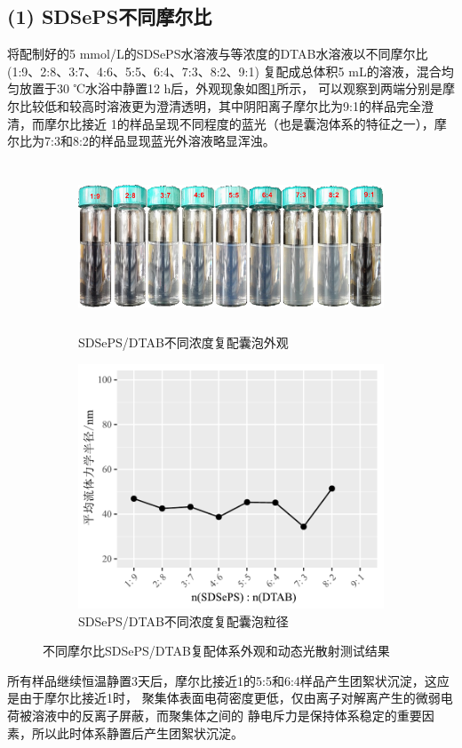\documentclass[bachelor,fandolfonts,replaceperiod]{jnuthesis}
\begin{document}
    \subsection*{(1) SDSePS不同摩尔比}
    将配制好的5 mmol/L的SDSePS水溶液与等浓度的DTAB水溶液以不同摩尔比 (1:9、2:8、3:7、4:6、5:5、6:4、7:3、8:2、9:1)
    复配成总体积5 mL的溶液，混合均匀放置于30 ℃水浴中静置12 h后，外观现象如图\ref{fig:SDSePS-DTAB-ratio}所示，
    可以观察到两端分别是摩尔比较低和较高时溶液更为澄清透明，其中阴阳离子摩尔比为9:1的样品完全澄清，而摩尔比接近
    1的样品呈现不同程度的蓝光（也是囊泡体系的特征之一），摩尔比为7:3和8:2的样品显现蓝光外溶液略显浑浊。
    \begin{figure}[htbp]
        \centering
        \begin{subfigure}[]{\textwidth}
            \centering
            \includegraphics[height=5cm]{figure/SDSePS-DTAB-ratio.png}
            \caption{SDSePS/DTAB不同浓度复配囊泡外观}\label{fig:SDSePS-DTAB-ratio}
        \end{subfigure}%
        
        \begin{subfigure}[]{\textwidth}
            \centering
            \includegraphics[width=.6\textwidth]{figure/SDSePS-DTAB-ratio-fig.pdf}
            \caption{SDSePS/DTAB不同浓度复配囊泡粒径}\label{fig:SDSePS-DTAB-ratio-fig}
        \end{subfigure}%
        \caption{不同摩尔比SDSePS/DTAB复配体系外观和动态光散射测试结果}
        \label{fig:不同摩尔比SDSePS/DTAB}
    \end{figure}
    所有样品继续恒温静置3天后，摩尔比接近1的5:5和6:4样品产生团絮状沉淀，这应是由于摩尔比接近1时，
    聚集体表面电荷密度更低，仅由离子对解离产生的微弱电荷被溶液中的反离子屏蔽，而聚集体之间的
    静电斥力是保持体系稳定的重要因素，所以此时体系静置后产生团絮状沉淀。
    
\end{document}
